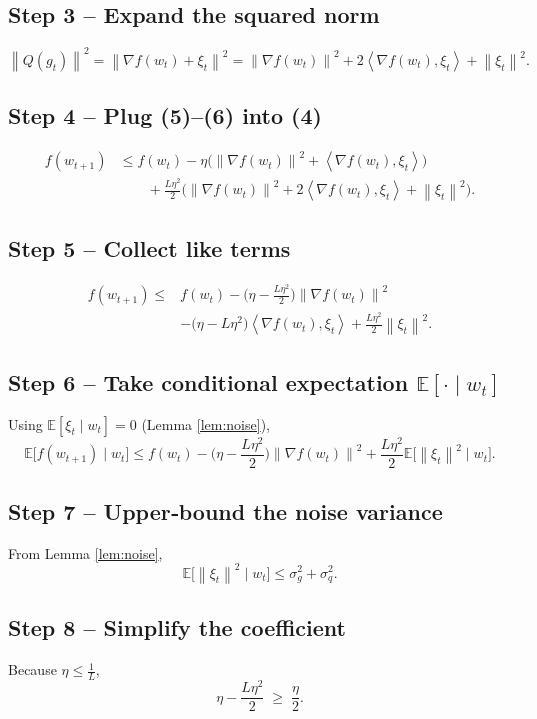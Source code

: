 \documentclass{article}
\newcommand{\E}{\mathbb{E}}
\newcommand{\norm}[1]{\left\|#1\right\|}
\newcommand{\ip}[2]{\left\langle #1,#2\right\rangle}
\begin{document}
\subsection*{Step 3 – Expand the squared norm}
\[
\norm{Q(g_t)}^2
=\norm{\nabla f(w_t)+\xi_t}^2
=\norm{\nabla f(w_t)}^2+2\ip{\nabla f(w_t)}{\xi_t}+\norm{\xi_t}^2.
\tag{6}
\]

\subsection*{Step 4 – Plug (5)–(6) into (4)}
\[
\begin{aligned}
f(w_{t+1})
&\le f(w_t)-\eta\big(\norm{\nabla f(w_t)}^2+\ip{\nabla f(w_t)}{\xi_t}\big)\\
&\qquad+\frac{L\eta^2}{2}\big(\norm{\nabla f(w_t)}^2+2\ip{\nabla f(w_t)}{\xi_t}+\norm{\xi_t}^2\big).
\end{aligned}
\tag{7}
\]

\subsection*{Step 5 – Collect like terms}
\[
\begin{aligned}
f(w_{t+1})\le
&f(w_t)
-\Big(\eta-\frac{L\eta^2}{2}\Big)\norm{\nabla f(w_t)}^2\\
&-\Big(\eta-\!L\eta^2\Big)\ip{\nabla f(w_t)}{\xi_t}
+\frac{L\eta^2}{2}\norm{\xi_t}^2.
\end{aligned}
\tag{8}
\]

\subsection*{Step 6 – Take conditional expectation $\E[\cdot\mid w_t]$}
Using $\E[\xi_t\mid w_t]=0$ (Lemma \ref{lem:noise}),
\[
\E\!\big[f(w_{t+1})\mid w_t\big]
\le f(w_t)-\Big(\eta-\frac{L\eta^2}{2}\Big)\norm{\nabla f(w_t)}^2
+\frac{L\eta^2}{2}\E\!\big[\norm{\xi_t}^2\mid w_t\big].
\tag{9}
\]

\subsection*{Step 7 – Upper‑bound the noise variance}
From Lemma \ref{lem:noise},
\[
\E\!\big[\norm{\xi_t}^2\mid w_t\big]\le\sigma_g^2+\sigma_q^2.
\tag{10}
\]

\subsection*{Step 8 – Simplify the coefficient}
Because $\eta\le\frac{1}{L}$,
\[
\eta-\frac{L\eta^2}{2}\;\ge\;\frac{\eta}{2}.
\tag{11}
\]
\end{document}
